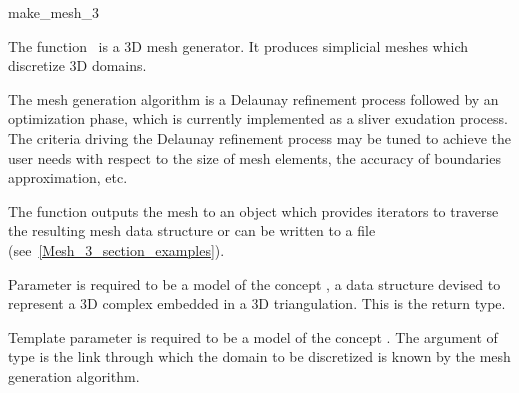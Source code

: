 \ccRefPageBegin


\begin{ccRefFunction}{make_mesh_3}  %


\ccDefinition

The function \ccRefName\ is a 3D
 mesh generator. It produces simplicial meshes which discretize
 3D domains.

The mesh generation algorithm is a Delaunay refinement process
followed by an optimization phase, which is currently implemented
as a sliver exudation process. 
The  criteria driving the Delaunay refinement
process may be tuned to achieve the user needs with respect to
the size of mesh elements, the accuracy of boundaries approximation,
etc.

The function outputs the mesh to an object which provides iterators to
traverse the resulting mesh data structure or can be written to a file
(see~\ref{Mesh_3_section_examples}).



\ccParameters

Parameter  is required to be a model of
the concept 
, a data structure devised to
represent a 3D complex embedded in a 3D triangulation. This is the return type.

Template parameter  is required to be a model of
the concept  . The argument  of type
 is the link through which the domain
to be discretized is known  by the mesh generation algorithm. 




\end{ccRefFunction}
